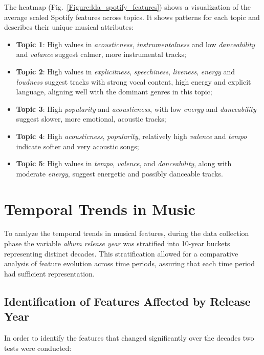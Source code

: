 The heatmap (Fig.~\ref{Figure:lda_spotify_features}) shows a visualization of
the average scaled Spotify features across topics. It shows patterns for each
topic and describes their unique musical attributes:

\begin{itemize}
  \item \textbf{Topic 1}: High values in \textit{acousticness},
    \textit{instrumentalness} and low \textit{danceability} and
    \textit{valance} suggest calmer, more instrumental tracks;
  \item \textbf{Topic 2}: High values in \textit{explicitness},
    \textit{speechiness}, \textit{liveness}, \textit{energy} and
    \textit{loudness} suggest tracks with strong vocal content, high energy
    and explicit language, aligning well with the dominant genres in this
    topic;
  \item \textbf{Topic 3}: High \textit{popularity} and \textit{acousticness},
    with low \textit{energy} and  \textit{danceability} suggest slower,
    more emotional, acoustic tracks;
  \item \textbf{Topic 4}: High \textit{acousticness},  \textit{popularity},
    relatively high \textit{valence} and \textit{tempo} indicate softer and
    very acoustic songs;
  \item \textbf{Topic 5}: High values in \textit{tempo}, \textit{valence}, and
    \textit{danceability}, along with moderate \textit{energy}, suggest
    energetic and possibly danceable tracks.
\end{itemize}


\section{Temporal Trends in Music}
\label{sec:temporaltrends}

To analyze the temporal trends in musical features, during the data collection
phase the variable \textit{album release year} was stratified into 10-year
buckets representing distinct decades. This stratification allowed for a
comparative analysis of feature evolution across time periods, assuring
that each time period had sufficient representation.


\subsection{Identification of Features Affected by Release Year}

In order to identify the features that changed significantly over the decades
two tests were conducted:


